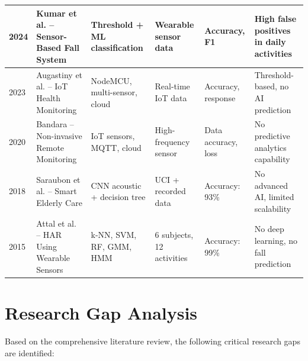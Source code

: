 \documentclass[conference]{IEEEtran}
\begin{document}
\begin{table}[!t]
\begin{tabular}{|p{0.8cm}|p{2.8cm}|p{2.5cm}|p{2.2cm}|p{1.8cm}|p{3.5cm}|}
\hline
2024 & Kumar et al. -- Sensor-Based Fall System & Threshold + ML classification & Wearable sensor data & Accuracy, F1 & High false positives in daily activities \\
\hline
2023 & Augastiny et al. -- IoT Health Monitoring & NodeMCU, multi-sensor, cloud & Real-time IoT data & Accuracy, response & Threshold-based, no AI prediction \\
\hline
2020 & Bandara -- Non-invasive Remote Monitoring & IoT sensors, MQTT, cloud & High-frequency sensor & Data accuracy, loss & No predictive analytics capability \\
\hline
2018 & Saraubon et al. -- Smart Elderly Care & CNN acoustic + decision tree & UCI + recorded data & Accuracy: 93\% & No advanced AI, limited scalability \\
\hline
2015 & Attal et al. -- HAR Using Wearable Sensors & k-NN, SVM, RF, GMM, HMM & 6 subjects, 12 activities & Accuracy: 99\% & No deep learning, no fall prediction \\
\hline
\end{tabular}
\end{table}

\section{Research Gap Analysis}

Based on the comprehensive literature review, the following critical research gaps are identified:
\end{document}
